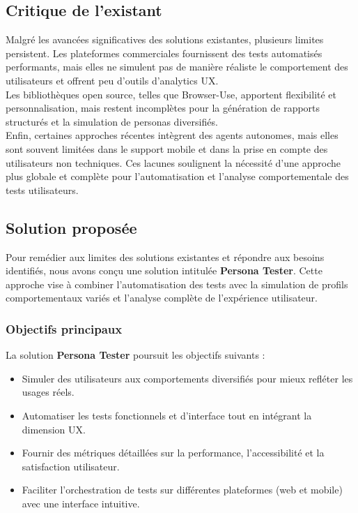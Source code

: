\subsection{Critique de l’existant}
Malgré les avancées significatives des solutions existantes, plusieurs limites persistent. Les plateformes commerciales fournissent des tests automatisés performants, mais elles ne simulent pas de manière réaliste le comportement des utilisateurs et offrent peu d’outils d’analytics UX.\\ Les bibliothèques open source, telles que Browser-Use, apportent flexibilité et personnalisation, mais restent incomplètes pour la génération de rapports structurés et la simulation de personas diversifiés. \\Enfin, certaines approches récentes intègrent des agents autonomes, mais elles sont souvent limitées dans le support mobile et dans la prise en compte des utilisateurs non techniques. Ces lacunes soulignent la nécessité d’une approche plus globale et complète pour l’automatisation et l’analyse comportementale des tests utilisateurs.


\subsection{Solution proposée}

Pour remédier aux limites des solutions existantes et répondre aux besoins identifiés, nous avons conçu une solution intitulée \textbf{Persona Tester}. Cette approche vise à combiner l'automatisation des tests avec la simulation de profils comportementaux variés et l'analyse complète de l'expérience utilisateur.

\subsubsection{Objectifs principaux}
La solution \textbf{Persona Tester} poursuit les objectifs suivants :
\begin{itemize}
    \item Simuler des utilisateurs aux comportements diversifiés pour mieux refléter les usages réels.
    \item Automatiser les tests fonctionnels et d'interface tout en intégrant la dimension UX.
    \item Fournir des métriques détaillées sur la performance, l’accessibilité et la satisfaction utilisateur.
    \item Faciliter l’orchestration de tests sur différentes plateformes (web et mobile) avec une interface intuitive.
\end{itemize}

